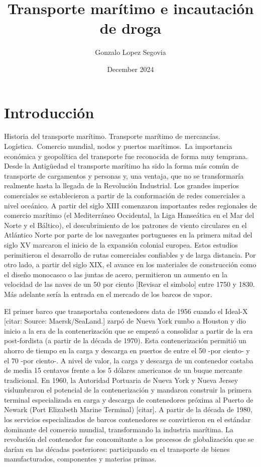 \documentclass{article}
\title{Transporte marítimo e incautación de droga}
\author{Gonzalo Lopez Segovia}
\date{December 2024}
\begin{document}
\maketitle

\section{Introducción}
Historia del transporte marítimo. Transporte marítimo de mercancías. Logística.\
Comercio mundial, nodos y puertos marítimos.\
La importancia económica y geopolítica del transporte fue reconocida de forma muy temprana. Desde la Antigüedad el transporte marítimo ha sido la forma más común de transporte de cargamentos y personas y, una ventaja, que no se transformaría realmente hasta la llegada de la Revolución Industrial. Los grandes imperios comerciales se establecieron a partir de la conformación de redes comerciales a nivel oceánico. A partir del siglo XIII comenzaron importantes redes regionales de comercio marítimo (el Mediterráneo Occidental, la Liga Hanseática en el Mar del Norte y el Báltico), el descubrimiento de los patrones de viento circulares en el Atlántico Norte por parte de los navegantes portugueses en la primera mitad del siglo XV marcaron el inicio de la expansión colonial europea. Estos estudios perimitieron el desarrollo de rutas comerciales confiables y de larga distancia. Por otro lado, a partir del siglo XIX, el avance en los materiales de construcción como el diseño monocasco o las juntas de acero, permitieron un aumento en la velocidad de las naves de un 50 por ciento [Revisar el simbolo] entre 1750 y 1830. Más adelante sería la entrada en el mercado de los barcos de vapor.\

El primer barco que transportaba contenedores data de 1956 cuando el Ideal-X [citar: Source: Maersk/SeaLand.] zarpó de Nueva York rumbo a Houston y dio inicio a la era de la contenerización que se empezó a consolidar a partir de la era post-fordista (a partir de la década de 1970). Esta contenerización permitió un ahorro de tiempo en la carga y descarga en puertos de entre el 50 -por ciento- y el 70 -por ciento-. A nivel de valor, la carga y descarga de un contenedor costaba de media 15 centavos frente a los 5 dólares americanos de un buque mercante tradicional. En 1960, la Autoridad Portuaria de Nueva York y Nueva Jersey vislumbraron el potencial de la contenerización y mandaron construir la primera terminal especializada en carga y descarga de contenedores próxima al Puerto de Newark (Port Elizabeth Marine Terminal) [citar]. A partir de la década de 1980, los servicios especializados de barcos contenedores se convirtieron en el estándar dominante del comercio mundial, transformando la industria marítima. La revolución del contenedor fue concomitante a los procesos de globalización que se darían en las décadas posteriores: participando en el transporte de bienes manufacturados, componentes y materias primas.\
\end{document}
